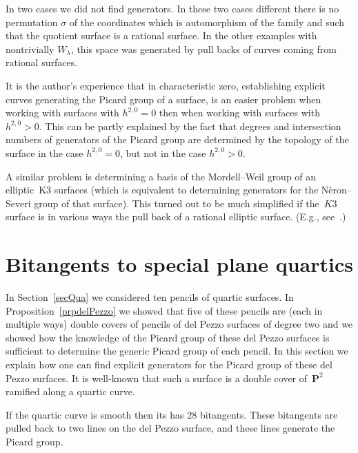 \documentclass[pdftex]{sigma}
\numberwithin{equation}{section}
\begin{document}
\begin{Remark}In two cases we did not f\/ind generators. In these two cases dif\/ferent there is no permutation $\sigma$ of the coordinates which is automorphism of the family and such that the quotient surface is a rational surface. In the other examples with nontrivially $W_\lambda$, this space was generated by pull backs of curves coming from rational surfaces.

It is the author's experience that in characteristic zero, establishing explicit curves generating the Picard group of a surface, is an easier problem when working with surfaces with $h^{2,0}=0$ then when working with surfaces with $h^{2,0}>0$. This can be partly explained by the fact that degrees and intersection numbers of generators of the Picard group are determined by the topology of the surface in the case $h^{2,0}=0$, but not in the case $h^{2,0}>0$.

A similar problem is determining a basis of the Mordell--Weil group of an elliptic~K3 surfaces (which is equivalent to determining generators for the N\`eron--Severi group of that surface). This turned out to be much simplif\/ied if the~$K3$ surface is in various ways the pull back of a rational elliptic surface. (E.g., see~\cite{ToMe,KloKuw,Scholten}.)
\end{Remark}

\appendix

\section{Bitangents to special plane quartics}\label{appBit}

In Section~\ref{secQua} we considered ten pencils of quartic surfaces. In Proposition~\ref{prpdelPezzo} we showed that f\/ive of these pencils are (each in multiple ways) double covers of pencils of del Pezzo surfaces of degree two and we showed how the knowledge of the Picard group of these del Pezzo surfaces is suf\/f\/icient to determine the generic Picard group of each pencil. In this section we explain how one can f\/ind explicit generators for the Picard group of these del Pezzo surfaces. It is well-known that such a surface is a double cover of~$\mathbf{P}^2$ ramif\/ied along a quartic curve.

If the quartic curve is smooth then its has 28 bitangents. These bitangents are pulled back to two lines on the del Pezzo surface, and these lines generate the Picard group.
\end{document}
